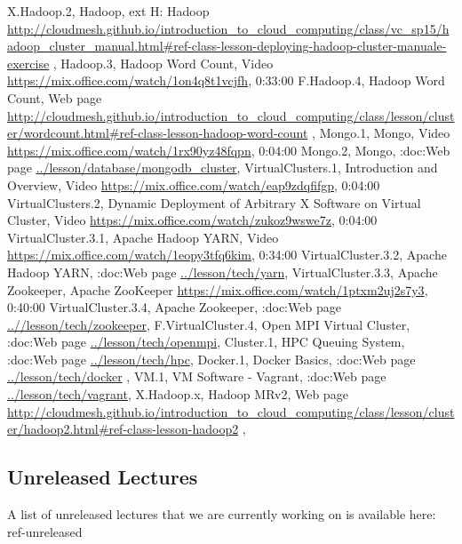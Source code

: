 X.Hadoop.2, Hadoop, ext H: Hadoop \url{http://cloudmesh.github.io/introduction_to_cloud_computing/class/vc_sp15/hadoop_cluster_manual.html#ref-class-lesson-deploying-hadoop-cluster-manuale-exercise}  , 
Hadoop.3, Hadoop Word Count, Video \url{https://mix.office.com/watch/1on4q8t1vcjfh},   0:33:00
F.Hadoop.4, Hadoop Word Count, Web page \url{http://cloudmesh.github.io/introduction_to_cloud_computing/class/lesson/cluster/wordcount.html#ref-class-lesson-hadoop-word-count}  , 
Mongo.1, Mongo, Video  \url{https://mix.office.com/watch/1rx90yz48fqpn},  0:04:00
Mongo.2, Mongo, :doc:Web page \url{../lesson/database/mongodb_cluster}, 
VirtualClusters.1, Introduction and Overview, Video \url{https://mix.office.com/watch/eap9zdqfifgp},   0:04:00   
VirtualClusters.2, Dynamic Deployment of Arbitrary X Software on Virtual Cluster,  Video \url{https://mix.office.com/watch/zukoz9wswe7z},   0:04:00
VirtualCluster.3.1, Apache Hadoop YARN, Video \url{https://mix.office.com/watch/1eopy3tfq6kim},   0:34:00
VirtualCluster.3.2, Apache Hadoop YARN, :doc:Web page \url{../lesson/tech/yarn},   
VirtualCluster.3.3, Apache Zookeeper, Apache ZooKeeper \url{https://mix.office.com/watch/1ptxm2uj2s7y3},   0:40:00
VirtualCluster.3.4, Apache Zookeeper, :doc:Web page \url{..//lesson/tech/zookeeper}, 
F.VirtualCluster.4, Open MPI Virtual Cluster,  :doc:Web page \url{../lesson/tech/openmpi},
Cluster.1, HPC Queuing System, :doc:Web page \url{../lesson/tech/hpc},
Docker.1, Docker Basics, :doc:Web page \url{../lesson/tech/docker} ,
VM.1, VM Software - Vagrant, :doc:Web page \url{../lesson/tech/vagrant}, 
X.Hadoop.x, Hadoop MRv2, Web page \url{http://cloudmesh.github.io/introduction_to_cloud_computing/class/lesson/cluster/hadoop2.html#ref-class-lesson-hadoop2} ,



\subsection{Unreleased Lectures}\label{unreleased-lectures}

A list of unreleased lectures that we are currently working on is
available here: ref-unreleased
